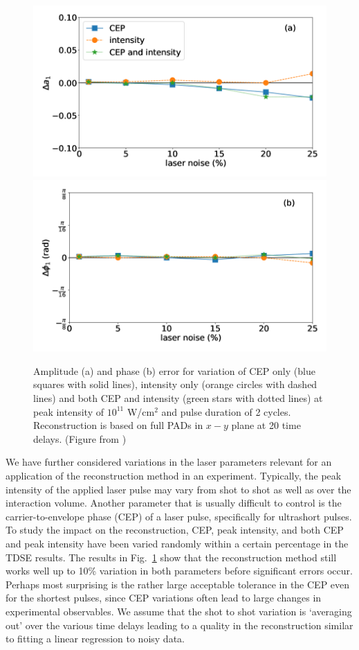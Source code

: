 \begin{figure}[!ht]
\centering
\includegraphics[width=0.49\linewidth]{figs/Photo_ionization/superpositions/Venzke_new_fig_9a.png}
\includegraphics[width=0.49\linewidth]{figs/Photo_ionization/superpositions/Venzke_new_fig_9b.png}
\caption{
Amplitude (a) and phase (b) error for variation of CEP only (blue squares with solid lines), intensity only (orange circles with dashed lines) and both CEP and intensity (green stars with dotted lines)
at peak intensity of  $10^{11}$ W/cm$^2$ and pulse duration of 2 cycles.  Reconstruction is based on full PADs in $x-y$ plane at 20 time delays. (Figure from \cite{venzke2021_wave})
} 
  \label{fig:noise}
\end{figure}

We have further considered variations in the laser parameters relevant for an application of the reconstruction method in an experiment. Typically, the peak intensity of the applied laser pulse may vary from shot to shot as well as over the interaction volume. Another parameter that is usually difficult to control is the carrier-to-envelope phase (CEP) of a laser pulse, specifically for ultrashort pulses. To study the impact on the reconstruction, CEP, peak intensity, and both CEP and peak intensity have been varied randomly within a certain percentage in the TDSE results. The results in Fig.~\ref{fig:noise} show that the reconstruction method still works well up to 10\% variation in both parameters before significant errors occur. Perhaps most surprising is the rather large acceptable tolerance in the CEP even for the shortest pulses, since CEP variations often lead to large changes in experimental observables. We assume that the shot to shot variation is `averaging out' over the various time delays leading to a quality in the reconstruction similar to fitting a linear regression to noisy data.

